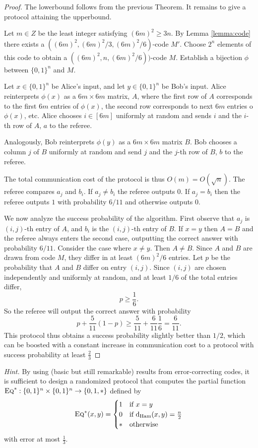 \begin{proof}
The lowerbound follows from the previous Theorem. It remains to give a protocol attaining the upperbound.

Let $m \in Z$ be the least integer satisfying $(6m)^2 \geq 3n$. By Lemma \ref{lemma:code} there exists a $((6m)^2, (6m)^2/3, (6m)^2/6)$-code $M'$. Choose $2^n$ elements of this code to obtain a $((6m)^2,n, (6m)^2/6))$-code $M$. Establish a bijection $\phi$ between $\{0,1\}^n$ and $M$.

Let $x \in\{0,1\}^n$ be Alice's input, and let $y \in \{0,1\}^n$ be Bob's input. Alice reinterprets $\phi(x)$ as a $6m\times 6m$ matrix, $A$, where the first row of $A$ corresponds to the first $6m$ entries of $\phi(x)$, the second row corresponds to next $6m$ entries o $\phi(x)$, etc. Alice chooses $i \in [6m]$ uniformly at random and sends $i$ and the $i$-th row of $A$, $a$ to the referee.

Analogously, Bob reinterprets $\phi(y)$ as a $6m\times 6m$ matrix $B$. Bob chooses a column $j$ of $B$ uniformly at random and send $j$ and the $j$-th row of $B$, $b$ to the referee.

The total communication cost of the protocol is thus $O(m) = O(\sqrt{n})$. The referee compares $a_j$ and $b_i$. If $a_j \neq b_i$ the referee outputs $0$. If $a_j = b_i$ then the referee outputs $1$ with probability $6/11$ and otherwise outputs $0$.

We now analyze the success probability of the algorithm. First observe that $a_j$ is $(i,j)$-th entry of $A$, and $b_i$ is the $(i,j)$-th entry of $B$. If $x=y$ then $A=B$ and the referee always enters the second case, outputting the correct answer with probability $6/11$. Consider the case where $x\neq y$. Then $A\neq B$. Since $A$ and $B$ are drawn from code $M$, they differ in at least $(6m)^2/6$ entries. Let $p$ be the probability that $A$ and $B$ differ on entry $(i,j)$. Since $(i,j)$ are chosen independently and uniformly at random, and at least $1/6$ of the total entries differ, 
$$p\geq \frac{1}{6}.$$
So the referee will output the correct answer with probability
$$p + \frac{5}{11}(1-p) \geq \frac{5}{11} + \frac{6}{11}\frac{1}{6} = \frac{6}{11}.$$
This protocol thus obtains a success probability slightly better than $1/2$, which can be boosted with a constant increase in communication cost to a protocol with success probability at least $\frac{2}{3}$
\end{proof}

\bigskip
\noindent \emph{Hint.} By using (basic but still remarkable) results from error-correcting codes, it is sufficient to design a randomized protocol that computes the partial function $\textsc{Eq}^* : \{0,1\}^n \times \{0,1\}^n \to \{0,1,*\}$ defined by
\[
\textsc{Eq}^*(x,y) = \begin{cases}
1 & \mbox{if } x = y \\
0 & \mbox{if } \mathrm{d}_{\mathrm{Ham}}(x,y) = \frac n2 \\
* & \mbox{otherwise}
\end{cases}
\]
with error at most $\frac13$.